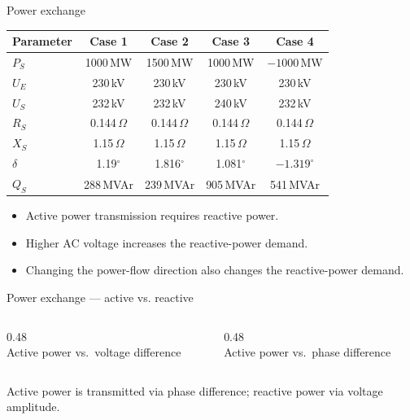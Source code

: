\begin{frame}{Power exchange}
  \centering
  \renewcommand{\arraystretch}{1.25}
  \begin{tabular}{@{}l c c c c@{}}
    \textbf{Parameter} & \textbf{Case 1} & \textbf{Case 2} & \textbf{Case 3} & \textbf{Case 4} \\
    \hline
    $P_S$ & 1000\,MW & 1500\,MW & 1000\,MW & $-1000$\,MW \\
    $U_E$ & 230\,kV & 230\,kV & 230\,kV & 230\,kV \\
    $U_S$ & 232\,kV & 232\,kV & 240\,kV & 232\,kV \\
    $R_S$ & 0.144\,$\Omega$ & 0.144\,$\Omega$ & 0.144\,$\Omega$ & 0.144\,$\Omega$ \\
    $X_S$ & 1.15\,$\Omega$ & 1.15\,$\Omega$ & 1.15\,$\Omega$ & 1.15\,$\Omega$ \\
    $\delta$ & 1.19$^\circ$ & 1.816$^\circ$ & 1.081$^\circ$ & $-1.319^\circ$ \\
    $Q_S$ & 288\,MVAr & 239\,MVAr & 905\,MVAr & 541\,MVAr \\
    \hline
  \end{tabular}

  \vspace{0.6em}
  \begin{itemize}
    \setlength{\itemsep}{0.2em}
    \item Active power transmission requires reactive power.
    \item Higher AC voltage increases the reactive-power demand.
    \item Changing the power-flow direction also changes the reactive-power demand.
  \end{itemize}
\end{frame}

\begin{frame}{Power exchange --- active vs. reactive}
  \begin{columns}[c,onlytextwidth]
    \begin{column}{0.48\textwidth}\centering
      \\[0.3em]
      {\footnotesize Active power vs.\ voltage difference}
    \end{column}
    \begin{column}{0.48\textwidth}\centering
      \\[0.3em]
      {\footnotesize Active power vs.\ phase difference}
    \end{column}
  \end{columns}
  \vspace{0.3em}
  {\color{atGray}\footnotesize Active power is transmitted via phase difference; reactive power via voltage amplitude.}
\end{frame}

